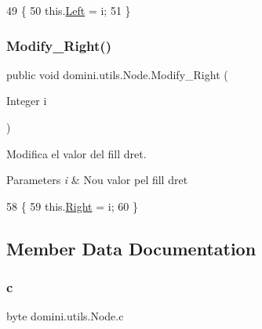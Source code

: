 \begin{DoxyCode}
49                                        \{
50         this.\hyperlink{classdomini_1_1utils_1_1Node_a2f1d911cf52953b29d42e5e020b82dbf}{Left} = i;
51     \}
\end{DoxyCode}
\mbox{\label{classdomini_1_1utils_1_1Node_a58d22f8330339b6d807cdef44d0eddf6}} 
\subsubsection{\texorpdfstring{Modify\+\_\+\+Right()}{Modify\_Right()}}
{\footnotesize\ttfamily public void domini.\+utils.\+Node.\+Modify\+\_\+\+Right (\begin{DoxyParamCaption}\item[{Integer}]{i }\end{DoxyParamCaption})\hspace{0.3cm}{\ttfamily [inline]}}



Modifica el valor del fill dret. 


\begin{DoxyParams}{Parameters}
{\em i} & Nou valor pel fill dret \\
\hline
\end{DoxyParams}

\begin{DoxyCode}
58                                         \{
59         this.\hyperlink{classdomini_1_1utils_1_1Node_a73c97e595bad2513ee0a06ee4620236a}{Right} = i;
60     \}
\end{DoxyCode}


\subsection{Member Data Documentation}
\mbox{\label{classdomini_1_1utils_1_1Node_a2fbef2557db813ae02a2d52032eaa6e1}} 
\subsubsection{\texorpdfstring{c}{c}}
{\footnotesize\ttfamily byte domini.\+utils.\+Node.\+c\hspace{0.3cm}{\ttfamily [package]}}


